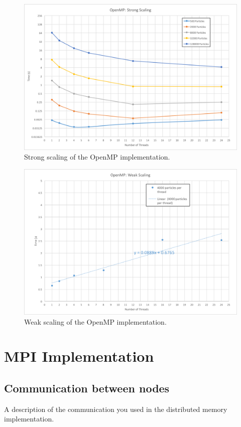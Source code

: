 \documentclass[12pt]{article}
\begin{document}
\begin{figure}
\includegraphics[width=\textwidth]{graphs/openmp_strong_scaling.png}
  \caption{Strong scaling of the OpenMP implementation.}
  \label{fig:openmp-strong}
\end{figure}

\begin{figure}
\includegraphics[width=\textwidth]{graphs/weak_scaling.png}
  \caption{Weak scaling of the OpenMP implementation.}
  \label{fig:openmp-weak}
\end{figure}

\section{MPI Implementation}

\subsection{Communication between nodes}
A description of the communication you used in the distributed memory implementation.
\end{document}
